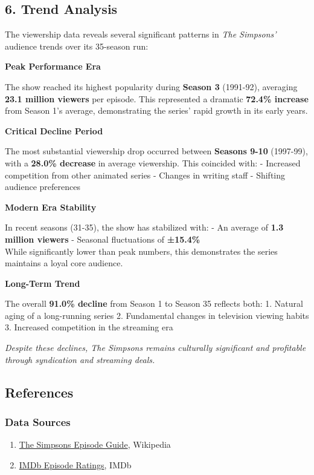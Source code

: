 \documentclass[
  a4paper,
]{article}
\providecommand{\tightlist}{%
  \setlength{\itemsep}{0pt}\setlength{\parskip}{0pt}}
\begin{document}
\subsection{6. Trend Analysis}\label{trend-analysis}

The viewership data reveals several significant patterns in \emph{The
Simpsons'} audience trends over its 35-season run:

\textbf{Peak Performance Era}

The show reached its highest popularity during \textbf{Season 3}
(1991-92), averaging \textbf{23.1 million viewers} per episode. This
represented a dramatic \textbf{72.4\% increase} from Season 1's average,
demonstrating the series' rapid growth in its early years.

\textbf{Critical Decline Period}

The most substantial viewership drop occurred between \textbf{Seasons
9-10} (1997-99), with a \textbf{28.0\% decrease} in average viewership.
This coincided with: - Increased competition from other animated series
- Changes in writing staff - Shifting audience preferences

\textbf{Modern Era Stability}

In recent seasons (31-35), the show has stabilized with: - An average of
\textbf{1.3 million viewers} - Seasonal fluctuations of
\textbf{±15.4\%}\\
While significantly lower than peak numbers, this demonstrates the
series maintains a loyal core audience.

\textbf{Long-Term Trend}

The overall \textbf{91.0\% decline} from Season 1 to Season 35 reflects
both: 1. Natural aging of a long-running series 2. Fundamental changes
in television viewing habits 3. Increased competition in the streaming
era

\emph{Despite these declines, The Simpsons remains culturally
significant and profitable through syndication and streaming deals.}

\subsection{References}\label{references}

\subsubsection{Data Sources}\label{data-sources}

\begin{enumerate}
\def\labelenumi{\arabic{enumi}.}
\tightlist
\item
  \href{https://en.wikipedia.org/wiki/List_of_The_Simpsons_episodes}{The
  Simpsons Episode Guide}, Wikipedia\\
\item
  \href{https://www.imdb.com/title/tt0096697/episodes}{IMDb Episode
  Ratings}, IMDb
\end{enumerate}
\end{document}
